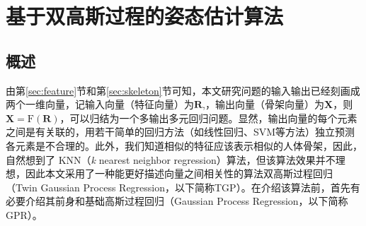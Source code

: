 

\chapter{基于双高斯过程的姿态估计算法}

\section{概述}
由第\ref{sec:feature}节和第\ref{sec:skeleton}节可知，本文研究问题的输入输出已经刻画成两个一维向量，记输入向量（特征向量）为$\mathbf{R}$,，输出向量（骨架向量）为$\mathbf{X}$，则$\mathbf{X}=\textrm{F}(\mathbf{R})$，可以归结为一个多输出多元回归问题。显然，输出向量的每个元素之间是有关联的，用若干简单的回归方法（如线性回归、SVM等方法）独立预测各元素是不合理的。此外，我们知道相似的特征应该表示相似的人体骨架，因此，自然想到了 KNN（\emph{k} nearest neighbor regression）算法，但该算法效果并不理想，因此本文采用了一种能更好描述向量之间相关性的算法\pozhehao 双高斯过程回归（Twin Gaussian Process Regression，以下简称TGP）。在介绍该算法前，首先有必要介绍其前身和基础\pozhehao 高斯过程回归（Gaussian Process Regression，以下简称GPR）。

